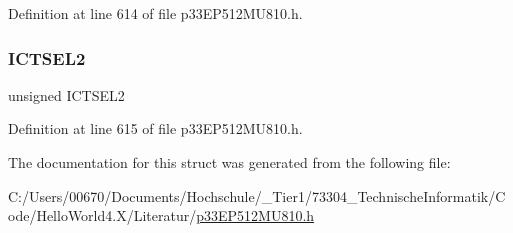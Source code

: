 Definition at line 614 of file p33\+E\+P512\+M\+U810.\+h.

\mbox{\label{structtag_i_c2_c_o_n1_b_i_t_s_a47d80892d449e6edbd5ba2ba9ff06deb}} 
\subsubsection{\texorpdfstring{I\+C\+T\+S\+E\+L2}{ICTSEL2}}
{\footnotesize\ttfamily unsigned I\+C\+T\+S\+E\+L2}



Definition at line 615 of file p33\+E\+P512\+M\+U810.\+h.



The documentation for this struct was generated from the following file\+:\begin{DoxyCompactItemize}
\item 
C\+:/\+Users/00670/\+Documents/\+Hochschule/\+\_\+\+Tier1/73304\+\_\+\+Technische\+Informatik/\+Code/\+Hello\+World4.\+X/\+Literatur/\hyperlink{p33_e_p512_m_u810_8h}{p33\+E\+P512\+M\+U810.\+h}\end{DoxyCompactItemize}
